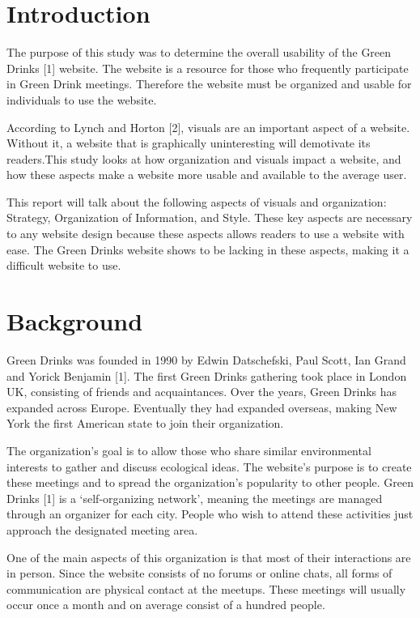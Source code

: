 \documentclass[12pt]{article}
\begin{document}
\section{Introduction}
The purpose of this study was to determine the overall usability of the Green Drinks [1] website. The website is a resource for those who frequently participate in Green Drink meetings. Therefore the website must be organized and usable for individuals to use the website.

According to Lynch and Horton [2], visuals are an important aspect of a website. Without it, a website that is graphically uninteresting will demotivate its readers.This study looks at how organization and visuals impact a website, and how these aspects make a website more usable and available to the average user.

This report will talk about the following aspects of visuals and organization: Strategy, Organization of Information, and Style. These key aspects are necessary to any website design because these aspects allows readers to use a website with ease. The Green Drinks website shows to be lacking in these aspects, making it a difficult website to use.
\section{Background}
Green Drinks was founded in 1990 by Edwin Datschefski, Paul Scott, Ian Grand and Yorick Benjamin [1]. The first Green Drinks gathering took place in London UK, consisting of friends and acquaintances. Over the years, Green Drinks has expanded across Europe. Eventually they had expanded overseas, making New York the first American state to join their organization. 

The organization’s goal is to allow those who share similar environmental interests to gather and discuss ecological ideas. The website’s purpose is to create these meetings and to spread the organization’s popularity to other people. Green Drinks [1] is a ‘self-organizing network’, meaning the meetings are managed through an organizer for each city. People who wish to attend these activities just approach the designated meeting area. 

One of the main aspects of this organization is that most of their interactions are in person. Since the website consists of no forums or online chats, all forms of communication are physical contact at the meetups. These meetings will usually occur once a month and on average consist of a hundred people.
\end{document}

